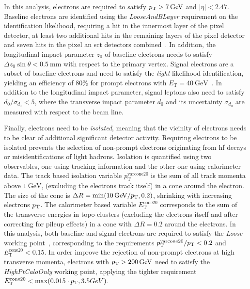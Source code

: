 In this analysis, electrons are required to satisfy $p_{\textrm{T}} > \SI{7}{GeV}$ and $\vert\eta\vert<2.47$. Baseline electrons are identified using the \textit{LooseAndBLayer} requirement on the identification likelihood, requiring a hit in the innermost layer of the pixel detector, at least two additional hits in the remaining layers of the pixel detector and seven hits in the pixel an \gls{sct} detectors combined~\cite{PERF-2017-01}. In addition, the longitudinal impact parameter $z_0$ of baseline electrons needs to satisfy $\Delta z_0\sin\theta < \SI{0.5}{\milli\meter}$ with respect to the primary vertex. Signal electrons are a subset of baseline electrons and need to satisfy the \textit{tight} likelihood identification, yielding an efficiency of 80\% for prompt electrons with $E_\mathrm{T}=\SI{40}{\GeV}$~\cite{PERF-2017-01}. In addition to the longitudinal impact parameter, signal leptons also need to satisfy $d_0/\sigma_{d_0} < 5$, where the transverse impact parameter $d_0$ and its uncertainty $\sigma_{d_0}$ are measured with respect to the beam line. 

Finally, electrons need to be \textit{isolated}, meaning that the vicinity of electrons needs to be clear of additional significant detector activity. Requiring electrons to be isolated prevents the selection of non-prompt electrons originating \eg from \gls{hf} decays or misidentifications of light hadrons. Isolation is quantified using two observables, one using tracking information and the other one using calorimeter data. The track based isolation variable $p_{\mathrm{T}}^{\mathrm{varcone20}}$ is the sum of all track momenta above $\SI{1}{\GeV}$, (excluding the electrons track itself) in a cone around the electron. The size of the cone is $\Delta R = \min (\SI{10}{\GeV}/\pt,0.2)$, \ie shrinking with increasing electrons $p_{\textrm{T}}$. The calorimeter based variable $E_{\mathrm{T}}^{\mathrm{cone20}}$ corresponds to the sum of the transverse energies in topo-clusters (excluding the electrons itself and after correcting for pileup effects) in a cone with $\Delta R = 0.2$ around the electrons. In this analysis, both baseline and signal electrons are required to satisfy the \textit{Loose} working point~\cite{EGAM-2018-01}, corresponding to the requirements $p_{\mathrm{T}}^{\mathrm{varcone20}}/p_{\textrm{T}} < 0.2$ and $E_{\mathrm{T}}^{\mathrm{cone20}} < 0.15$. In order improve the rejection of non-prompt electrons at high transverse momenta, electrons with $\pt >\SI{200}{\GeV}$ need to satisfy the \textit{HighPtCaloOnly} working point, applying the tighter requirement $E_{\mathrm{T}}^{\mathrm{cone20}} < \max (0.015\cdot p_{\textrm{T}},3.5GeV)$. 

